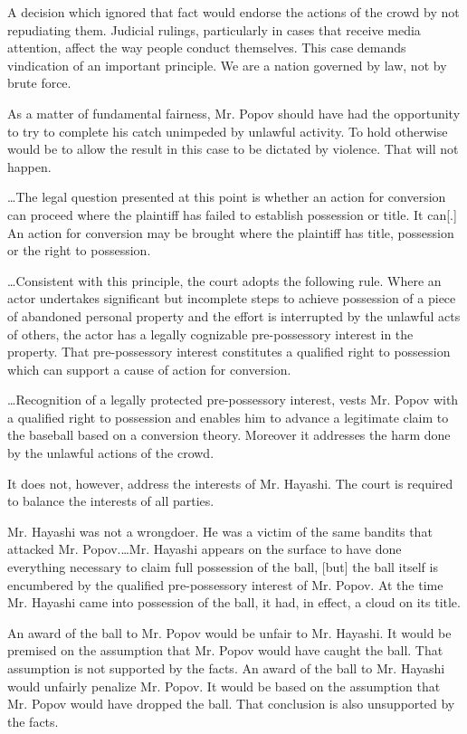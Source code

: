 A decision which ignored that fact would endorse the actions of the crowd by not
repudiating them. Judicial rulings, particularly in cases that receive media
attention, affect the way people conduct themselves. This case demands
vindication of an important principle. We are a nation governed by law, not by
brute force. 

As a matter of fundamental fairness, Mr. Popov should have had the opportunity
to try to complete his catch unimpeded by unlawful activity. To hold otherwise
would be to allow the result in this case to be dictated by violence. That will
not happen.

\ldots The legal question presented at this point is whether an action for
conversion can proceed where the plaintiff has failed to establish possession or
title. It can[.] An action for conversion may be brought where the plaintiff has
title, possession or the right to possession. 

\ldots Consistent with this principle, the court adopts the following rule.
Where an actor undertakes significant but incomplete steps to achieve possession
of a piece of abandoned personal property and the effort is interrupted by the
unlawful acts of others, the actor has a legally cognizable pre-possessory
interest in the property. That pre-possessory interest constitutes a qualified
right to possession which can support a cause of action for conversion.

\ldots Recognition of a legally protected pre-possessory interest, vests Mr.
Popov with a qualified right to possession and enables him to advance a
legitimate claim to the baseball based on a conversion theory. Moreover it
addresses the harm done by the unlawful actions of the crowd.

It does not, however, address the interests of Mr. Hayashi. The court is
required to balance the interests of all parties.

Mr. Hayashi was not a wrongdoer. He was a victim of the same bandits that
attacked Mr. Popov.\ldots Mr. Hayashi appears on the surface to have done
everything necessary to claim full possession of the ball, [but] the ball itself
is encumbered by the qualified pre-possessory interest of Mr. Popov. At the time
Mr. Hayashi came into possession of the ball, it had, in effect, a cloud on its
title.

An award of the ball to Mr. Popov would be unfair to Mr. Hayashi. It would be
premised on the assumption that Mr. Popov would have caught the ball. That
assumption is not supported by the facts. An award of the ball to Mr. Hayashi
would unfairly penalize Mr. Popov. It would be based on the assumption that Mr.
Popov would have dropped the ball. That conclusion is also unsupported by the
facts.

